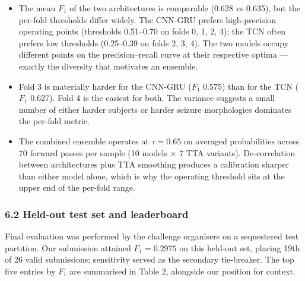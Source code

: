 \documentclass[
  11pt,
]{article}
\providecommand{\tightlist}{%
  \setlength{\itemsep}{0pt}\setlength{\parskip}{0pt}}
\begin{document}
\begin{itemize}
\tightlist
\item
  The mean \(F_1\) of the two architectures is comparable (0.628 vs
  0.635), but the per-fold thresholds differ widely. The CNN-GRU prefers
  high-precision operating points (thresholds 0.51--0.70 on folds 0, 1,
  2, 4); the TCN often prefers low thresholds (0.25--0.39 on folds 2, 3,
  4). The two models occupy different points on the precision--recall
  curve at their respective optima --- exactly the diversity that
  motivates an ensemble.
\item
  Fold 3 is materially harder for the CNN-GRU (\(F_1\) 0.575) than for
  the TCN (\(F_1\) 0.627). Fold 4 is the easiest for both. The variance
  suggests a small number of either harder subjects or harder seizure
  morphologies dominates the per-fold metric.
\item
  The combined ensemble operates at \(\tau{=}0.65\) on averaged
  probabilities across 70 forward passes per sample (10 models × 7 TTA
  variants). De-correlation between architectures plus TTA smoothing
  produces a calibration sharper than either model alone, which is why
  the operating threshold sits at the upper end of the per-fold range.
\end{itemize}

\subsubsection{6.2 Held-out test set and
leaderboard}\label{held-out-test-set-and-leaderboard}

Final evaluation was performed by the challenge organisers on a
sequestered test partition. Our submission attained \(F_1 = 0.2975\) on
this held-out set, placing 19th of 26 valid submissions; sensitivity
served as the secondary tie-breaker. The top five entries by \(F_1\) are
summarised in Table 2, alongside our position for context.
\end{document}
